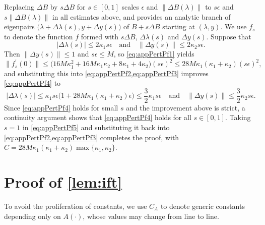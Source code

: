 \documentclass[a4paper,11pt]{article}
\providecommand{\abs}[1]{\lvert#1\rvert}
\providecommand{\norm}[1]{\lVert#1\rVert}
\begin{document}
Replacing $\Delta B$ by $s\Delta B$ for $s\in[0,1]$ scales $\epsilon$ and $\norm{\Delta B(\lambda)}$ to $s\epsilon$ and $s\norm{\Delta B(\lambda)}$ in all estimates above, and \cite[Thm.~2.1]{Andrew1993} provides an analytic branch of eigenpairs $\bigl(\lambda+\Delta \lambda(s),y+\Delta y(s)\bigr)$ of $B+s\Delta B$ starting at $(\lambda,y)$. We use $f_{s}$ to denote the function $f$ formed with $s\Delta B$, $\Delta \lambda(s)$ and $\Delta y(s)$. Suppose that
\begin{equation}
    \label{eq:appPertPf4}
    \abs{\Delta \lambda(s)} \leq 2\kappa_{1}s\epsilon
    \quad\text{and}\quad
    \norm{\Delta y(s)} \leq 2\kappa_{2}s\epsilon.
\end{equation}
Then $\norm{\Delta y(s)}\leq 1$ and $s\epsilon\leq M$, so \cref{eq:appPertPf1} yields
\begin{equation}
    \label{eq:appPertPf5}
    \norm{f_{s}^{\prime}(0)} \leq \bigl(16M\kappa_{1}^{2}+16M\kappa_{1}\kappa_{2}+8\kappa_{1}+4\kappa_{2}\bigr)(s\epsilon)^{2}
    \leq 28M\kappa_{1}(\kappa_{1}+\kappa_{2})(s\epsilon)^{2},
\end{equation}
and substituting this into \cref{eq:appPertPf2,eq:appPertPf3} improves \cref{eq:appPertPf4} to
\begin{equation*}
    \abs{\Delta \lambda(s)}\leq \kappa_{1}s\epsilon\bigl(1+28M\kappa_{1}(\kappa_{1}+\kappa_{2})\epsilon\bigr)\leq \frac{3}{2}\kappa_{1}s\epsilon
    \quad\text{and}\quad
    \norm{\Delta y(s)}\leq \frac{3}{2}\kappa_{2}s\epsilon.
\end{equation*}
Since \cref{eq:appPertPf4} holds for small $s$ and the improvement above is strict, a continuity argument shows that \cref{eq:appPertPf4} holds for all $s\in[0,1]$. Taking $s=1$ in \cref{eq:appPertPf5} and substituting it back into \cref{eq:appPertPf2,eq:appPertPf3} completes the proof, with $C=28M\kappa_{1}(\kappa_{1}+\kappa_{2})\max\{\kappa_{1},\kappa_{2}\}$.
    
    

\section{Proof of \cref{lem:ift}}
\label{app:ift}

To avoid the proliferation of constants, we use $C_{A}$ to denote generic constants depending only on $A(\cdot)$, whose values may change from line to line. 
\end{document}
